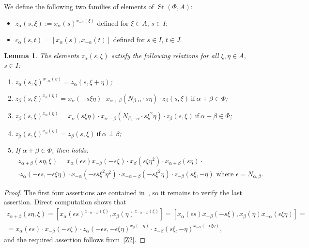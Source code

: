 \documentclass[oneside, 8pt]{amsart}
\newtheorem{lemma}{Lemma}
\theoremstyle{remark}
\theoremstyle{definition}
\DeclareMathOperator{\St}{St}
\numberwithin{equation}{section}
\begin{document}
We define the following two families of elements of $\St(\Phi, A)$:
\begin{itemize}
 \item $z_\alpha(s, \xi) := x_\alpha(s)^{x_{-\alpha}(\xi)}$ defined for $\xi \in A$, $s \in I$;
 \item $c_\alpha(s, t) = [x_\alpha(s), x_{-\alpha}(t)]$ defined for $s \in I$, $t \in J$.
\end{itemize}

\begin{lemma}\label{Zrels} The elements $z_\alpha(s, \xi)$ satisfy the following relations for all $\xi, \eta\in A$, $s\in I$:
\begin{enumerate} 
\item\label{Z1} $z_{\alpha}(s, \xi) ^ {x_{-\alpha}(\eta)} = z_{\alpha}(s, \xi + \eta)$;
\item\label{Z2} $z_{\beta}(s, \xi) ^ {x_{\alpha}(\eta)} = x_{\alpha} (- s\xi \eta) \cdot x_{\alpha+\beta} (N_{\beta, \alpha}\cdot s\eta)     \cdot z_{\beta}(s, \xi)\ \text{if}\ \alpha + \beta \in \Phi$;
\item\label{Z3} $z_{\beta}(s, \xi) ^ {x_{\alpha}(\eta)} = x_{\alpha} (s\xi \eta) \cdot x_{\alpha-\beta} (N_{\beta,-\alpha}\cdot s\xi^2\eta) \cdot z_{\beta}(s, \xi)\ \text{if}\ \alpha - \beta \in \Phi$;

\item\label{Z4} $z_{\beta}(s, \xi) ^ {x_{\alpha}(\eta)} = z_{\beta}(s, \xi)\ \text{if}\ \alpha\perp\beta$;
\item\label{Z5} If $\alpha+\beta\in\Phi$, then holds:
\begin{multline} \nonumber z_{\alpha+\beta}(s\eta, \xi) = x_\alpha(\epsilon s) x_{-\beta}(-s\xi) \cdot x_{\beta}(s\xi\eta^2) \cdot x_{\alpha+\beta}(s \eta) \cdot \\ \cdot z_\alpha(-\epsilon s, -\epsilon \xi\eta) \cdot
  x_{-\alpha}(-\epsilon s\xi^2\eta^2) \cdot x_{-\alpha-\beta}(- s \xi^2 \eta) \cdot z_{-\beta}(s\xi, -\eta)\text{ where $\epsilon = N_{\alpha,\beta}$.}\end{multline}
\end{enumerate} \end{lemma}
\begin{proof}
The first four assertions are contained in~\cite[Lemma~9]{S15}, so it remains to verify the last assertion.
Direct computation shows that
\begin{multline} \nonumber
  z_{\alpha+\beta}(s\eta, \xi) = [x_\alpha(\epsilon s)^{x_{-\alpha-\beta}(\xi)}, x_\beta(\eta)^{x_{-\alpha-\beta}(\xi)}] =
  [x_\alpha(\epsilon s) x_{-\beta}(-s\xi), x_{\beta}(\eta) x_{-\alpha}(\epsilon \xi\eta)] = \\ 
  = x_\alpha(\epsilon s) \cdot x_{-\beta}(-s\xi) \cdot z_\alpha(-\epsilon s, -\epsilon \xi\eta)^{x_{\beta}(-\eta)} \cdot z_{-\beta}(s\xi, -\eta)^{x_{-\alpha}(-\epsilon \xi\eta)},
\end{multline} 
and the required assertion follows from~\eqref{Z2}.
\end{proof}
\end{document}
